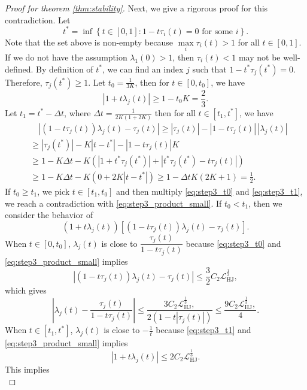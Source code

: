 \documentclass{article} %
\theoremstyle{plain}
\theoremstyle{definition}
\theoremstyle{remark}
\newcommand{\LHJ}{\mathcal{L}_{\text{HJ}}}
\newcommand{\lam}{\lambda}
\newcommand{\dt}{\Delta t}
\newcommand{\parentheses}[1]{\left(#1\right)}
\newcommand{\sqbra}[1]{\left[#1\right]}
\newcommand{\curlybra}[1]{\left\{#1\right\}}
\newcommand{\abs}[1]{\left|#1\right|}
\begin{document}
\begin{proof}[Proof for theorem \ref{thm:stability}]
Next, we give a rigorous proof for this contradiction.
Let
$$t^* = \inf \curlybra{t \in [0,1] : 1-t\tau_i(t)=0 \text{ for some }i}.$$
Note that the set above is non-empty because $\max\limits_i\tau_i(t) > 1$ for all $t\in[0,1]$. If we do not have the assumption $\lam_1(0) > 1$, then $\tau_i(t)<1$ may not be well-defined. By definition of $t^*$, we can find an index $j$ such that $1-t^*\tau_j(t^*)=0$. Therefore, $\tau_j(t^*) \ge 1$. Let $t_0= \frac{1}{3K}$, then for $t \in [0,t_0]$, we have
\begin{equation}\label{eq:step3_t0}
\abs{1 + t \lam_j(t)} \ge 1 - t_0 K = \frac23.
\end{equation}
Let $t_1 = t^* - \dt$, where $\dt = \frac{1}{2K(1+2K)}$ then for all $t \in [t_1, t^*]$, we have
\begin{equation}\label{eq:step3_t1}
\begin{aligned}
& \quad \abs{(1-t \tau_j(t)) \lam_j(t) - \tau_j(t)} \ge |\tau_j(t)| - |1-t \tau_j(t)|\, |\lam_j(t)|\\
& \ge |\tau_j(t^*)| - K|t-t^*| - |1-t \tau_j(t)|K \\
&\ge 1- K \dt - K\parentheses{ |1+t^*\tau_j(t^*)| + |t^*\tau_j(t^*) - t \tau_j(t)| } \\
& \ge 1- K \dt - K\parentheses{ 0 + 2K|t-t^*| } \ge 1 - \dt K(2K+1) = \frac12.
\end{aligned}
\end{equation}
If $t_0 \ge t_1$, we pick $t \in [t_1,t_0]$ and then multiply \eqref{eq:step3_t0} and \eqref{eq:step3_t1}, we reach a contradiction with \eqref{eq:step3_product_small}. If $t_0 < t_1$, then we consider the behavior of
$$(1 + t\lam_j(t)) \sqbra{ (1-t \tau_j(t)) \lam_j(t) - \tau_j(t)}.$$
When $t \in [0,t_0]$, $\lam_j(t)$ is close to $\dfrac{\tau_j(t)}{1 - t \tau_j(t)}$ because \eqref{eq:step3_t0} and \eqref{eq:step3_product_small} implies 
\begin{equation*}
\abs{(1-t \tau_j(t)) \lam_j(t) - \tau_j(t)} \le \frac32 C_2 \LHJ^{\frac13},
\end{equation*}
which gives
\begin{equation}\label{eq:close_t0}
\abs{\lam_j(t) - \dfrac{\tau_j(t)}{1 - t \tau_j(t)}} \le \dfrac{3 C_2 \LHJ^{\frac13},}{2 (1 - t |\tau_j(t)|)} \le \dfrac{9 C_2 \LHJ^{\frac13},}{4}.
\end{equation}
When $t \in [t_1,t^*]$, $\lam_j(t)$ is close to $-\frac1t$ because \eqref{eq:step3_t1} and \eqref{eq:step3_product_small} implies
$$\abs{1 + t \lam_j(t)} \le 2 C_2 \LHJ^{\frac13}.$$
This implies
\begin{equation}\label{eq:close_t1}

\end{equation}
\end{proof}
\end{document}

